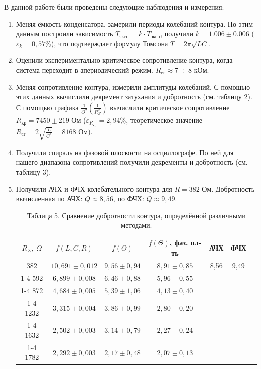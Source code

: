 \documentclass[a4paper]{article}
\begin{document}
В данной работе были проведены следующие наблюдения и измерения:
\begin{enumerate}
\item Меняя ёмкость конденсатора, замерили периоды колебаний контура. По этим данным построили зависимость $T_{\text{эксп}} = k  \cdot T_{\text{эксп}}$, получили $k = 1.006 \pm 0.006$ ($\varepsilon_k = 0,57 \%$), что подтверждает формулу Томсона $T = 2\pi \sqrt{LC}$.
\item Оценили экспериментально критическое сопротивление контура, когда система переходит в апериодический режим. $R_{\text{cr}} \approx 7 $ ÷ $ 8$ кОм.
\item Меняя сопротивление контура, измерили амплитуды колебаний.  С помощью этих данных вычислили декремент затухания и добротность (см. таблицу 2). С помощью графика $\frac{1}{\Theta^2}(\frac{1}{R_\Sigma^2})$ вычислили критическое сопротивление $R_\text{кр} = 7450 \pm 219$ Ом ($\varepsilon_{R_\text{кр}} = 2,94 \%$, теоретическое значение $R_{\text{cr}} = 2\sqrt{\frac{L}{C^*}} = 8168 \text{ Ом}$).
\item Получили спираль на фазовой плоскости на осциллографе. По ней для нашего диапазона сопротивлений получили декременты и добротность (см. таблицу 3).
\item Получили АЧХ и ФЧХ колебательного контура для $R = 382$ Ом. Добротность вычисленная по АЧХ: $Q \approx 8,56$, по ФЧХ: $Q \approx 9,49$.

\begin{table}[h!]
    \centering
    \begin{tabular}{|c|c|c|c|c|c|c|}
        \hline
        $R_\Sigma,\ \Omega$ &
        $f(L, C, R)$ &
        $f(\Theta)$ &
        $f(\Theta)$, фаз. пл-ть &
        АЧХ &
        ФЧХ \\ \hline
        382 &
        $10{,}691 \pm 0{,}012$ &
        $9{,}56 \pm 0{,}94$ &
        $8{,}91 \pm 0{,}85$ &
        8{,}56 &
        9{,}49 \\ \cline{1-4}
        592 &
        $6{,}899 \pm 0{,}008$ &
        $6{,}46 \pm 0{,}88$ &
        $5{,}96 \pm 0{,}55$ &
        & \\ \cline{1-4}
        872 &
        $4{,}684 \pm 0{,}005$ &
        $5{,}39 \pm 1{,}06$ &
        $4{,}13 \pm 0{,}40$ &
        & \\ \cline{1-4}
        1232 &
        $3{,}315 \pm 0{,}004$ &
        $3{,}86 \pm 0{,}99$ &
        $2{,}80 \pm 0{,}20$ &
        & \\ \cline{1-4}
        1632 &
        $2{,}502 \pm 0{,}003$ &
        $3{,}14 \pm 0{,}79$ &
        $2{,}27 \pm 0{,}24$ &
        & \\ \cline{1-4}
        1782 &
        $2{,}292 \pm 0{,}003$ &
        $2{,}17 \pm 0{,}48$ &
        $2{,}07 \pm 0{,}13$ &
        & \\ \hline
    \end{tabular}
    \caption{Таблица 5. Сравнение добротности контура, определённой различными методами.}
    \label{tab:q_comparison_final}
\end{table}

\end{enumerate}
\end{document}
